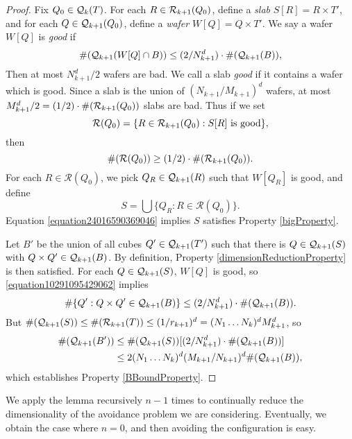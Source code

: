 \begin{proof}
    Fix $Q_0 \in \operatorname{\mathcal{Q}}_k(T)$. For each $R \in \operatorname{\mathcal{R}}_{k+1}(Q_0)$, define a \emph{slab} $S[R] = R \times T'$, and for each $Q \in \operatorname{\mathcal{Q}}_{k+1}(Q_0)$, define a \emph{wafer} $W[Q] = Q \times T'$. We say a wafer $W[Q]$ is \emph{good} if
    \begin{equation} \label{equation10291095429062}
        \#(\operatorname{\mathcal{Q}}_{k+1}(W[Q] \cap B)) \leq (2/N_{k+1}^d) \cdot \#(\operatorname{\mathcal{Q}}_{k+1}(B)),
    \end{equation}
    Then at most $N_{k+1}^d/2$ wafers are bad. We call a slab \emph{good} if it contains a wafer which is good. Since a slab is the union of $(N_{k+1}/M_{k+1})^d$ wafers, at most $M_{k+1}^d /2 = (1/2) \cdot \#(\operatorname{\mathcal{R}}_{k+1}(Q_0))$ slabs are bad. Thus if we set
    \[ \mathcal{R}(Q_0) = \{ R \in \operatorname{\mathcal{R}}_{k+1}(Q_0) : S[R]\ \text{is good} \}, \]
    then
    \begin{equation} \label{equation24016590369046}
        \#(\mathcal{R}(Q_0)) \geq (1/2) \cdot \#(\operatorname{\mathcal{R}}_{k+1}(Q_0)).
    \end{equation}
    For each $R \in \mathcal{R}(Q_0)$, we pick $Q_R \in \operatorname{\mathcal{Q}}_{k+1}(R)$ such that $W[Q_R]$ is good, and define
    \[ S = \bigcup \{ Q_R : R \in \mathcal{R}(Q_0) \}. \]
    Equation \eqref{equation24016590369046} implies $S$ satisfies Property \ref{bigProperty}.

    Let $B'$ be the union of all cubes $Q' \in \operatorname{\mathcal{Q}}_{k+1}(T')$ such that there is $Q \in \operatorname{\mathcal{Q}}_{k+1}(S)$ with $Q \times Q' \in \operatorname{\mathcal{Q}}_{k+1}(B)$. By definition, Property \ref{dimensionReductionProperty} is then satisfied. For each $Q \in \operatorname{\mathcal{Q}}_{k+1}(S)$, $W[Q]$ is good, so \eqref{equation10291095429062} implies
    \[ \# \{ Q' : Q \times Q' \in \operatorname{\mathcal{Q}}_{k+1}(B) \} \leq (2/N_{k+1}^d) \cdot \#(\operatorname{\mathcal{Q}}_{k+1}(B)). \]
    But $\#(\operatorname{\mathcal{Q}}_{k+1}(S)) \leq \#(\operatorname{\mathcal{R}}_{k+1}(T)) \leq (1/r_{k+1})^d = (N_1 \dots N_k)^d M_{k+1}^d$, so
    \begin{align*}
        \#(\operatorname{\mathcal{Q}}_{k+1}(B')) &\leq \#(\operatorname{\mathcal{Q}}_{k+1}(S))[(2/N_{k+1}^d) \cdot \#(\operatorname{\mathcal{Q}}_{k+1}(B))]\\
        &\leq 2(N_1 \dots N_k)^d (M_{k+1}/N_{k+1})^d \#(\operatorname{\mathcal{Q}}_{k+1}(B)),
    \end{align*}
    which establishes Property \ref{BBoundProperty}.
\end{proof}

We apply the lemma recursively $n-1$ times to continually reduce the dimensionality of the avoidance problem we are considering. Eventually, we obtain the case where $n = 0$, and then avoiding the configuration is easy.

